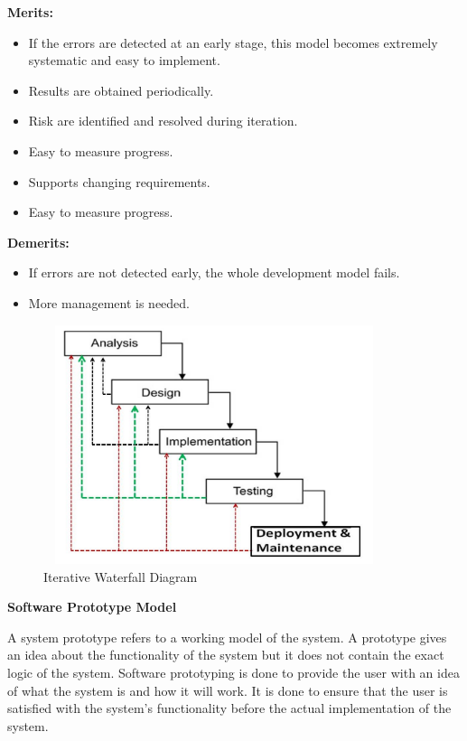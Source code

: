 \documentclass{article}
\begin{document}
\textbf{Merits:}
\begin{itemize}
    \item 			If the errors are detected at an early stage, this model becomes extremely systematic and easy to implement.
    \item Results are obtained periodically.
    \item Risk are identified and resolved during iteration.
    \item  	Easy to measure progress.
    \item 	Supports changing requirements.
    \item 	Easy to measure progress.

    \end{itemize}
\vspace{1.5cm}
\textbf{Demerits:}
\begin{itemize}
   \item 	If errors are not detected early, the whole development model fails.
 \item 	More management is needed.

\end{itemize}
 \begin{figure}
  \includegraphics[width=10cm, height=7cm]{fig2.jpg}
  \caption{Iterative Waterfall Diagram}
  
\end{figure}
\vspace{0.5cm}

\large{\textbf{Software Prototype Model}}

A system prototype refers to a working model of the system. A prototype gives an idea about the functionality of the system but it does not contain the exact logic of the system. Software prototyping is done to provide the user with an idea of what the system is and how it will work. It is done to ensure that the user is satisfied with the system’s functionality before the actual implementation of the system.\\
\end{document}

